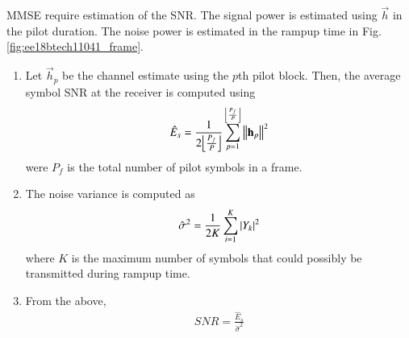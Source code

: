 MMSE require estimation of the SNR.  The signal power is estimated using $\vec{h}$ in the pilot duration.  The noise power is
estimated in the rampup time in Fig. \ref{fig:ee18btech11041_frame}.

\begin{enumerate}[label=\thesubsection.\arabic*.,ref=\thesubsection.\theenumi]


\item Let $\vec{h}_p$
%
be the channel estimate using the $p$th pilot block.  Then, the average symbol SNR at the receiver is computed using
\begin{align}
\hat{E}_s = \frac{1}{2\floor*{\frac{P_f}{P}}}\sum_{p=1}^{\floor*{\frac{P_f}{P}}}\norm{\vec{h}_p}^2
\end{align}
%
were $P_f$ is the total number of pilot symbols in a frame.
\item The noise variance is computed as
\begin{align}
\hat{\sigma}^2 = \frac{1}{2K}\sum_{i=1}^{K}\left\vert Y_k\right\vert^2
\end{align}
%
where $K$ is the maximum number of symbols that could possibly be transmitted during rampup time.
\item From the above, 
\begin{align}
SNR = \frac{\hat{E}_s}{\hat{\sigma}^2}
\end{align}
%

\end{enumerate}
